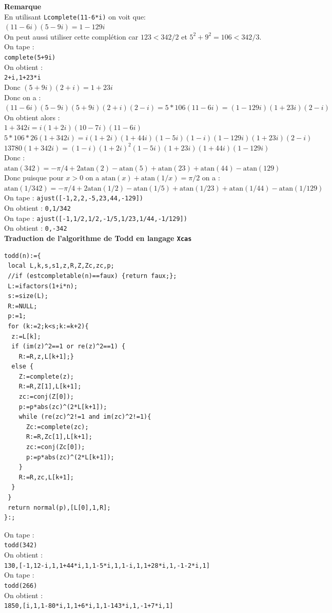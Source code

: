 \documentclass[a4paper,11pt]{book}
\newcommand{\atan}{\mbox{atan}}
\begin{document}
{\bf Remarque}\\
En utilisant {\tt Lcomplete(11-6*i)} on voit que:\\
$(11-6i)(5-9i)=1-129i$ \\
On peut aussi utiliser cette compl\'etion car $123<342/2$ et 
$5^2+9^2=106<342/3$.\\
On tape :\\
{\tt complete(5+9i)}\\
On obtient :\\
{\tt 2+i,1+23*i}\\
Donc $(5+9i)(2+i)=1+23i$\\
Donc on a :\\
$(11-6i)(5-9i)(5+9i)(2+i)(2-i)=5*106(11-6i)=(1-129i)(1+23i)(2-i)$\\
On obtient alors :\\
$1+342i=i(1+2i)(10-7i)(11-6i)$\\
$5*106*26(1+342i)=i(1+2i)(1+44i)(1-5i)(1-i)(1-129i)(1+23i)(2-i)$\\
$13780(1+342i)=(1-i)(1+2i)^2(1-5i)(1+23i)(1+44i)(1-129i)$\\
Donc :\\
$\atan(342)=-\pi/4+2\atan(2)-\atan(5)+\atan(23)+\atan(44)-\atan(129)$\\
Donc puisque pour $x>0$ on a $\atan(x)+\atan(1/x)=\pi/2$ on a :\\
$\atan(1/342)=-\pi/4+2\atan(1/2)-\atan(1/5)+\atan(1/23)+\atan(1/44)-\atan(1/129)$\\
On tape : {\tt ajust([-1,2,2,-5,23,44,-129])}\\
On obtient : {\tt 0,1/342}\\
On tape : {\tt ajust([-1,1/2,1/2,-1/5,1/23,1/44,-1/129])}\\
On obtient : {\tt 0,-342}\\
{\bf Traduction de l'algorithme de Todd en langage {\tt Xcas}}\\
\begin{verbatim} 
todd(n):={
 local L,k,s,s1,z,R,Z,Zc,zc,p;
 //if (estcompletable(n)==faux) {return faux;};
 L:=ifactors(1+i*n);
 s:=size(L);
 R:=NULL;
 p:=1;
 for (k:=2;k<s;k:=k+2){
  z:=L[k];
  if (im(z)^2==1 or re(z)^2==1) {
    R:=R,z,L[k+1];}
  else {
    Z:=complete(z);
    R:=R,Z[1],L[k+1];
    zc:=conj(Z[0]);
    p:=p*abs(zc)^(2*L[k+1]);
    while (re(zc)^2!=1 and im(zc)^2!=1){
      Zc:=complete(zc);
      R:=R,Zc[1],L[k+1];
      zc:=conj(Zc[0]);
      p:=p*abs(zc)^(2*L[k+1]);
    }
    R:=R,zc,L[k+1];
  }
 }
 return normal(p),[L[0],1,R];
}:;
\end{verbatim}
On tape :\\
{\tt todd(342)}\\
On obtient :\\
{\tt 130,[-1,12-i,1,1+44*i,1,1-5*i,1,1-i,1,1+28*i,1,-1-2*i,1]}\\
On tape :\\
{\tt todd(266)}\\
On obtient :\\
{\tt 1850,[i,1,1-80*i,1,1+6*i,1,1-143*i,1,-1+7*i,1]}
\end{document}
